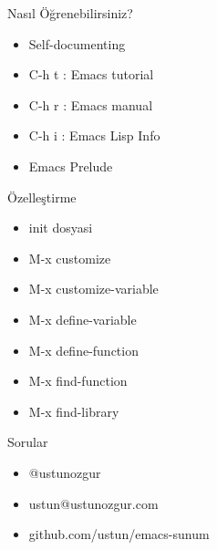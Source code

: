 \documentclass[presentation]{beamer}
\begin{document}
\begin{frame}[label=sec-9]{Nasıl Öğrenebilirsiniz?}
\begin{itemize}
\item Self-documenting
\item C-h t : Emacs tutorial
\item C-h r : Emacs manual
\item C-h i : Emacs Lisp Info
\item Emacs Prelude
\end{itemize}
\end{frame}

\begin{frame}[label=sec-10]{Özelleştirme}
\begin{itemize}
\item init dosyasi
\item M-x customize
\item M-x customize-variable
\item M-x define-variable
\item M-x define-function
\item M-x find-function
\item M-x find-library
\end{itemize}
\end{frame}

\begin{frame}[label=sec-11]{Sorular}
\begin{itemize}
\item @ustunozgur
\item ustun@ustunozgur.com
\item github.com/ustun/emacs-sunum
\end{itemize}
\end{frame}
\end{document}
